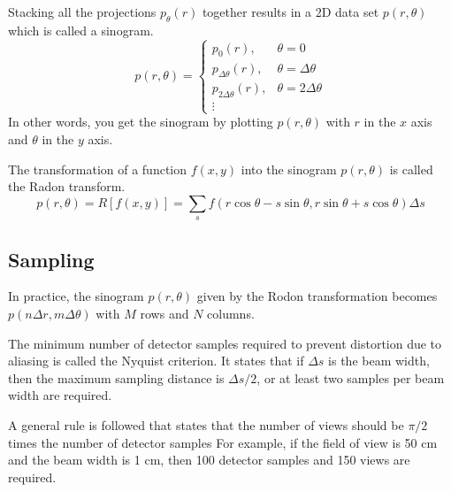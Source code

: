 \documentclass[../../../main.tex]{subfiles}
\begin{document}
Stacking all the projections $p_\theta(r)$ together results in a 2D data set $p(r,\theta)$ which is called a sinogram.
\begin{equation*}
    p(r,\theta)=\begin{cases}
        p_0(r),               & \theta=0             \\
        p_{\Delta\theta}(r),  & \theta=\Delta\theta  \\
        p_{2\Delta\theta}(r), & \theta=2\Delta\theta \\
        \vdots
    \end{cases}
\end{equation*}
In other words, you get the sinogram by plotting $p(r,\theta)$ with $r$ in the $x$ axis and $\theta$ in the $y$ axis.

The transformation of a function $f(x,y)$ into the sinogram $p(r,\theta)$ is called the Radon transform.
\begin{equation*}
    p(r,\theta)=R \left[ f(x,y) \right]=\sum_s f \left( r \cos \theta-s \sin \theta,r \sin \theta+s \cos \theta \right) \Delta s
\end{equation*}

\subsection{Sampling}
In practice, the sinogram $p(r,\theta)$ given by the Rodon transformation becomes $p(n\Delta  r,m\Delta\theta)$ with $M$ rows and $N$ columns.

The minimum number of detector samples required to prevent distortion due to aliasing is called the Nyquist criterion.
It states that if $\Delta s$ is the beam width, then the maximum sampling distance is $\Delta s/2$, or at least two samples per beam width are required.

A general rule is followed that states that the number of views should be $\pi/2$ times the number of detector samples
For example, if the field of view is 50 cm and the beam width is 1 cm, then 100 detector samples and 150 views are required.
\end{document}
